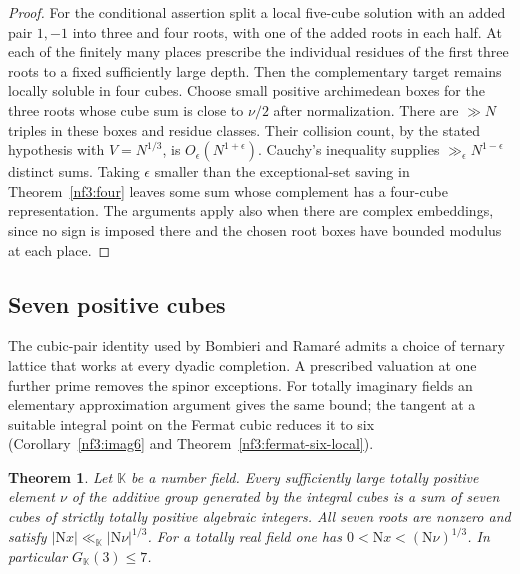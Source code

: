 \documentclass[11pt,letterpaper]{article}
\newtheorem{theorem}{Theorem}[section]
\theoremstyle{definition}
\numberwithin{equation}{section}
\begin{document}
\begin{proof}
For the conditional assertion split a local five-cube solution with an
added pair $1,-1$ into three and four roots, with one of the added
roots in each half. At each of the finitely many places prescribe the
individual residues of the first three roots to a fixed sufficiently
large depth. Then the complementary target remains locally soluble in
four cubes. Choose small positive archimedean boxes for the three roots
whose cube sum is close to $\nu/2$ after normalization. There are
$\gg N$ triples in these boxes and residue classes. Their collision
count, by the stated hypothesis with $V=N^{1/3}$, is
$O_\epsilon(N^{1+\epsilon})$. Cauchy's inequality supplies
$\gg_\epsilon N^{1-\epsilon}$ distinct sums. Taking $\epsilon$ smaller
than the exceptional-set saving in Theorem~\ref{nf3:four} leaves some
sum whose complement has a four-cube representation. The arguments
apply also when there are complex embeddings, since no sign is imposed
there and the chosen root boxes have bounded modulus at each place.
\end{proof}

\subsection{Seven positive cubes}\label{nf3:sevenreal}
The cubic-pair identity used by Bombieri and Ramar\'e
\cite[\S2]{nf3:ramare} admits a choice of ternary lattice that works
at every dyadic completion. A prescribed valuation at one further
prime removes the spinor exceptions. For totally imaginary fields an
elementary approximation argument gives the same bound; the tangent at a
suitable integral point on the Fermat cubic reduces it to six
(Corollary~\ref{nf3:imag6} and Theorem~\ref{nf3:fermat-six-local}).

\begin{theorem}\label{nf3:realG7}
Let $\mathbb K$ be a number field. Every sufficiently
large totally positive element $\nu$ of the additive group generated
by the integral cubes is a sum of seven cubes of strictly totally
positive algebraic integers. All seven roots are nonzero and satisfy $|\mathrm N x|\ll_{\mathbb K}|\mathrm N\nu|^{1/3}$. For a totally real field one has
$0<\mathrm N x<(\mathrm N\nu)^{1/3}$. In particular
$G_{\mathbb K}(3)\le7$.
\end{theorem}
\end{document}
